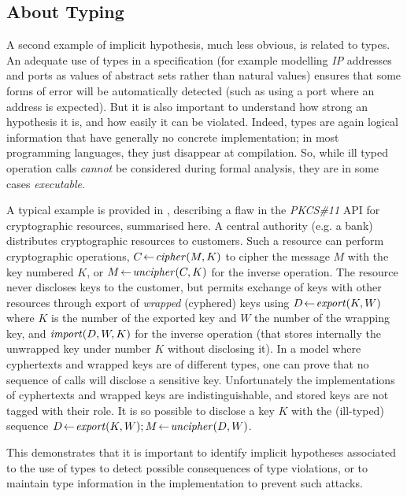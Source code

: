 \documentclass[conference]{IEEEtran}
\begin{document}
\subsection{About Typing}\label{typing}

A second example of implicit hypothesis, much less obvious, is related to types. An adequate
use of types in a specification (for example modelling \emph{IP} addresses and ports as
values of abstract sets rather than natural values) ensures that some forms of error will be
automatically detected (such as using a port where an address is expected). But it is also
important to understand how strong an hypothesis it is, and how easily it can be violated.
Indeed, types are again logical information that have generally no concrete implementation; in
most programming languages, they just disappear at compilation. So, while ill typed operation
calls \emph{cannot} be considered during formal analysis, they are in some cases
\emph{executable}.

A typical example is provided in \cite{DBLP:conf/ches/Clulow03}, describing a flaw in the
\emph{PKCS\#11} API for cryptographic resources, summarised here. A central authority (e.g. a
bank) distributes cryptographic resources to customers. Such a resource can perform
cryptographic operations, {\small$C\!\gets\!\textrm{\emph{cipher}}(M,K)$} to cipher the message
{\small$M$} with the key numbered {\small$K$}, or {\small$M\!\gets\!\textrm{\emph{uncipher}}(C,K)$} for
the inverse operation. The resource never discloses keys to the customer, but permits exchange
of keys with other resources through export of \emph{wrapped} (cyphered) keys using
{\small$D\!\gets\!\textrm{\emph{export}}(K,W)$} where {\small$K$} is the number of the exported key and
{\small$W$} the number of the wrapping key, and {\small$\textrm{\emph{import}}(D,W,K)$} for the inverse
operation (that stores internally the unwrapped key under number {\small$K$} without
disclosing it). In a model where cyphertexts and wrapped keys are of different types, one can
prove that no sequence of calls will disclose a sensitive key. Unfortunately the
implementations of cyphertexts and wrapped keys are indistinguishable, and stored keys are not
tagged with their role. It is so possible to disclose a key {\small$K$} with the (ill-typed)
sequence {\small$D\!\gets\!\textrm{\emph{export}}(K,W);M\!\gets\!\textrm{\emph{uncipher}}(D,W)$}.

This demonstrates that it is important to identify implicit hypotheses associated to the use
of types to detect possible consequences of type violations, or to maintain type information
in the implementation to prevent such attacks.
\end{document}
